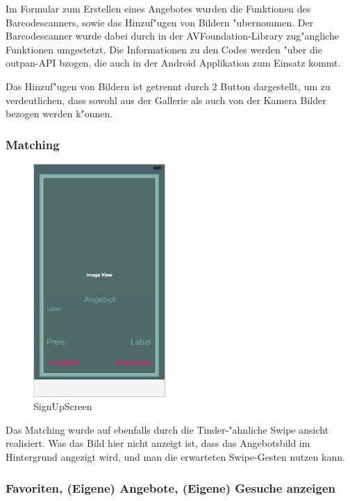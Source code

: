 Im Formular zum Erstellen eines Angebotes wurden die Funktionen des Barcodescanners, sowie das Hinzuf"ugen von Bildern "ubernommen. 
Der Barcodescanner wurde dabei durch in der AVFoundation-Library zug"angliche Funktionen umgestetzt. 
Die Informationen zu den Codes werden "uber die outpan-API bzogen, die auch in der Android Applikation zum Einsatz kommt. 

Das Hinzuf"ugen von Bildern ist getrennt durch 2 Button dargestellt, um zu verdeutlichen, dass sowohl aus der Gallerie als auch von der Kamera Bilder bezogen werden k"onnen.

\subsubsection*{Matching}

\begin{figure}[H]
\begin{center}
\includegraphics[width=0.45\textwidth]{./Bilder/iosmatch.png}
\caption{SignUpScreen}
\label{fig:ioslogin}
\end{center}
\end{figure}

Das Matching wurde auf ebenfalls durch die Tinder-"ahnliche Swipe ansicht realisiert. Was das Bild hier nicht anzeigt ist, dass das Angebotsbild im Hintergrund angezigt wird, und man die erwarteten Swipe-Gesten nutzen kann. 

\subsubsection*{Favoriten, (Eigene) Angebote, (Eigene) Gesuche anzeigen}

